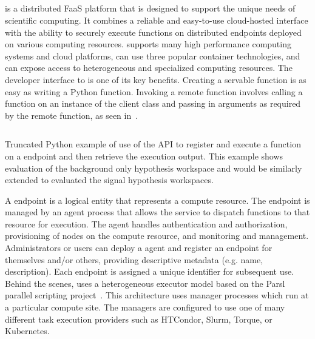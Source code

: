 \subsection{\funcX{}}\label{subsec:funcX}
\funcX{} is a distributed FaaS platform that is designed to support the unique needs of scientific computing. It combines a reliable and easy-to-use cloud-hosted interface with the ability to securely execute functions on distributed endpoints deployed on various computing resources. \funcX{} supports many high performance computing systems and cloud platforms, can use three popular container technologies, and can expose access to heterogeneous and specialized computing resources. The developer interface to \funcX{} is one of its key benefits. Creating a servable function is as easy as writing a Python function. Invoking a remote function involves calling a function on an instance of the \funcX{} client class and passing in arguments as required by the remote function, as seen in~.

\begin{listing}
 \inputminted{python}{src/code/funcX_registration_example.py}
 \caption{Truncated Python example of use of the \funcX{} API to register and execute a \pyhf{} function on a \funcX{} endpoint and then retrieve the execution output.
 This example shows evaluation of the background only hypothesis workspace and would be similarly extended to evaluated the signal hypothesis workspaces.}
 \label{lst:funcX_registration_example}
\end{listing}

A \funcX{} endpoint is a logical entity that represents a compute resource. The endpoint is managed by an agent process that allows the \funcX{} service to dispatch functions to that resource for execution. The agent handles authentication and authorization, provisioning of nodes on the compute resource, and monitoring and management. Administrators or users can deploy a \funcX{} agent and register an endpoint for themselves and/or others, providing descriptive  metadata (e.g. name, description). Each endpoint is assigned a unique identifier for subsequent use.\\

Behind the scenes, \funcX{} uses a heterogeneous executor model based on the Parsl parallel scripting project~\cite{Parsl_paper}.  This architecture uses manager processes which run at a particular compute site. The managers are configured to use one of many different task execution providers such as HTCondor, Slurm, Torque, or Kubernetes.\\

